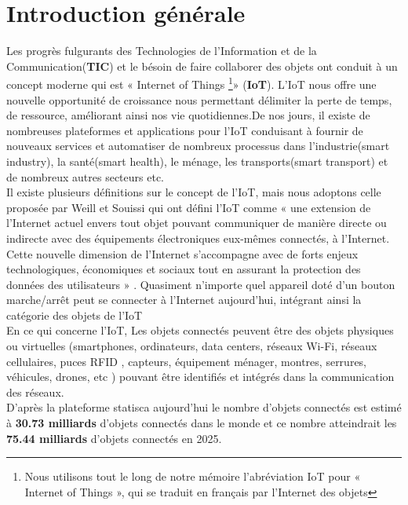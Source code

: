 \documentclass[a4paper,12pt]{report}
\begin{document}
\selectfont


\chapter*{Introduction générale}
\parindent=0.2cm	
Les progrès fulgurants des Technologies de l’Information et de la Communication(\textbf{TIC}) et le bésoin de faire collaborer des objets ont conduit à un concept moderne qui est « Internet of Things \footnote{Nous utilisons tout le long de notre mémoire l’abréviation IoT pour « Internet of Things », qui se traduit en français par l’Internet des objets}» (\textbf{IoT}). L'IoT nous offre une nouvelle opportunité de croissance nous permettant délimiter la perte de temps, de ressource, améliorant ainsi nos vie quotidiennes.De nos jours, il existe de nombreuses plateformes et applications pour l’IoT conduisant à fournir de nouveaux services et automatiser de nombreux processus dans l'industrie(smart industry), la santé(smart health), le ménage, les transports(smart transport) et de nombreux autres secteurs etc.\\

Il existe plusieurs définitions sur le concept de l’IoT, mais nous adoptons celle proposée par Weill et Souissi qui ont défini l’IoT comme « une extension de l'Internet actuel envers tout objet pouvant communiquer de manière directe ou indirecte avec des équipements électroniques eux-mêmes connectés, à l'Internet. Cette nouvelle dimension de l'Internet s'accompagne avec de forts enjeux technologiques, économiques et sociaux tout en assurant la protection des données des utilisateurs » \cite{refdiot}. Quasiment n'importe quel appareil doté d'un bouton marche/arrêt peut se connecter à l'Internet aujourd'hui, intégrant ainsi la catégorie des objets de l'IoT \cite{ciscorefiot}\\ 
En ce qui concerne l'IoT, Les objets connectés peuvent être des objets  physiques ou virtuelles (smartphones, ordinateurs, data centers, réseaux Wi-Fi, réseaux cellulaires, puces RFID , capteurs, équipement ménager, montres, serrures, véhicules, drones, etc ) pouvant être identifiés et intégrés dans la communication des réseaux.\\
D'après la plateforme statisca \cite{refstatic} aujourd'hui le nombre d'objets connectés est estimé à \textbf{30.73 milliards} d'objets connectés dans le monde et ce nombre atteindrait les \textbf{75.44 milliards } d'objets connectés en 2025.\\
\end{document}
